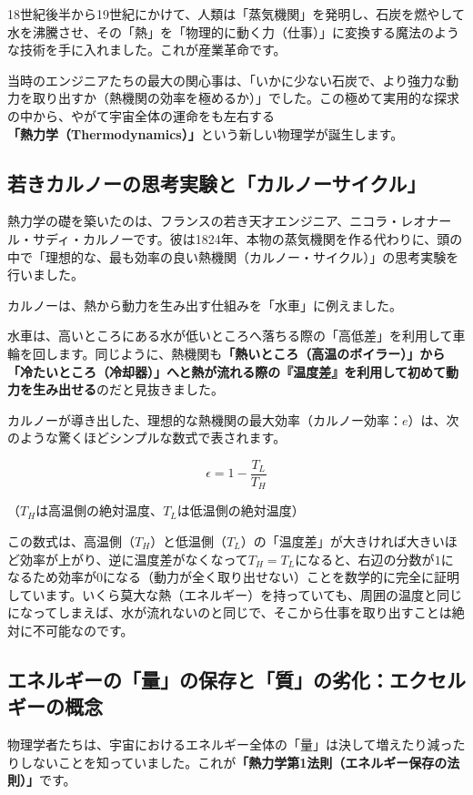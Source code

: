 18世紀後半から19世紀にかけて、人類は「蒸気機関」を発明し、石炭を燃やして水を沸騰させ、その「熱」を「物理的に動く力（仕事）」に変換する魔法のような技術を手に入れました。これが産業革命です。

当時のエンジニアたちの最大の関心事は、「いかに少ない石炭で、より強力な動力を取り出すか（熱機関の効率を極めるか）」でした。この極めて実用的な探求の中から、やがて宇宙全体の運命をも左右する\textbf{「熱力学（Thermodynamics）」}という新しい物理学が誕生します。

\subsection{若きカルノーの思考実験と「カルノーサイクル」}

熱力学の礎を築いたのは、フランスの若き天才エンジニア、ニコラ・レオナール・サディ・カルノーです。彼は1824年、本物の蒸気機関を作る代わりに、頭の中で「理想的な、最も効率の良い熱機関（カルノー・サイクル）」の思考実験を行いました。

カルノーは、熱から動力を生み出す仕組みを「水車」に例えました。

水車は、高いところにある水が低いところへ落ちる際の「高低差」を利用して車輪を回します。同じように、熱機関も\textbf{「熱いところ（高温のボイラー）」から「冷たいところ（冷却器）」へと熱が流れる際の『温度差』を利用して初めて動力を生み出せる}のだと見抜きました。

カルノーが導き出した、理想的な熱機関の最大効率（カルノー効率：\(e\)）は、次のような驚くほどシンプルな数式で表されます。

\[
\epsilon=1-\frac{T_L}{T_H}
\]

（\(T_H\)は高温側の絶対温度、\(T_L\)は低温側の絶対温度）

この数式は、高温側（\(T_H\)）と低温側（\(T_L\)）の「温度差」が大きければ大きいほど効率が上がり、逆に温度差がなくなって\(T_H=T_L\)になると、右辺の分数が\(1\)になるため効率が\(0\)になる（動力が全く取り出せない）ことを数学的に完全に証明しています。いくら莫大な熱（エネルギー）を持っていても、周囲の温度と同じになってしまえば、水が流れないのと同じで、そこから仕事を取り出すことは絶対に不可能なのです。

\subsection{エネルギーの「量」の保存と「質」の劣化：エクセルギーの概念}

物理学者たちは、宇宙におけるエネルギー全体の「量」は決して増えたり減ったりしないことを知っていました。これが\textbf{「熱力学第1法則（エネルギー保存の法則）」}です。

